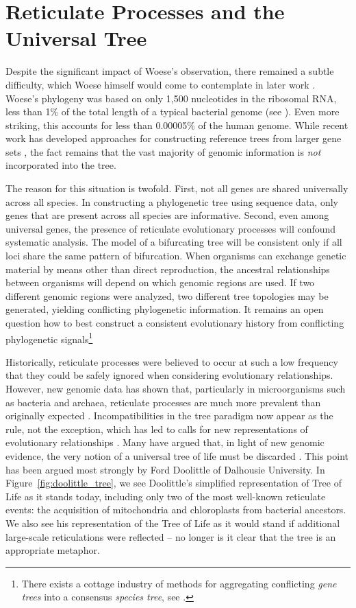 \section{Reticulate Processes and the Universal Tree}

Despite the significant impact of Woese's observation, there remained a subtle difficulty, which Woese himself would come to contemplate in later work \cite{Woese:2004ba,Goldenfeld:2007im}.
Woese's phylogeny was based on only 1,500 nucleotides in the ribosomal RNA, less than 1\% of the total length of a typical bacterial genome (see \cite{Dagan:2006up}).
Even more striking, this accounts for less than 0.00005\% of the human genome.
While recent work has developed approaches for constructing reference trees from larger gene sets \cite{Ciccarelli:2006gw}, the fact remains that the vast majority of genomic information is \emph{not} incorporated into the tree.

The reason for this situation is twofold.
First, not all genes are shared universally across all species.
In constructing a phylogenetic tree using sequence data, only genes that are present across all species are informative.
Second, even among universal genes, the presence of reticulate evolutionary processes will confound systematic analysis.
The model of a bifurcating tree will be consistent only if all loci share the same pattern of bifurcation.
When organisms can exchange genetic material by means other than direct reproduction, the ancestral relationships between organisms will depend on which genomic regions are used.
If two different genomic regions were analyzed, two different tree topologies may be generated, yielding conflicting phylogenetic information.
It remains an open question how to best construct a consistent evolutionary history from conflicting phylogenetic signals\footnote{There exists a cottage industry of methods for aggregating conflicting \emph{gene trees} into a consensus \emph{species tree}, see \cite{Maddison:1997ew}.}

Historically, reticulate processes were believed to occur at such a low frequency that they could be safely ignored when considering evolutionary relationships.
However, new genomic data has shown that, particularly in microorganisms such as bacteria and archaea, reticulate processes are much more prevalent than originally expected \cite{Ochman:2000dr}.
Incompatibilities in the tree paradigm now appear as the rule, not the exception, which has led to calls for new representations of evolutionary relationships \cite{Doolittle:1999,Doolittle:2006}.
Many have argued that, in light of new genomic evidence, the very notion of a universal tree of life must be discarded \cite{Koonin:2008bt,Koonin:2008tj}.
This point has been argued most strongly by Ford Doolittle of Dalhousie University.
In Figure~\ref{fig:doolittle_tree}, we see Doolittle's simplified representation of Tree of Life as it stands today, including only two of the most well-known reticulate events: the acquisition of mitochondria and chloroplasts from bacterial ancestors.
We also see his representation of the Tree of Life as it would stand if additional large-scale reticulations were reflected -- no longer is it clear that the tree is an appropriate metaphor.

